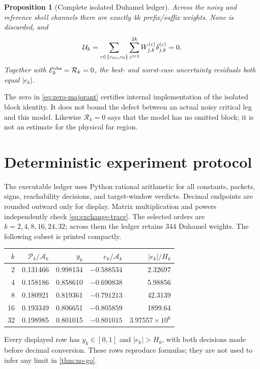 \documentclass[11pt]{article}
\newtheorem{proposition}[theorem]{Proposition}
\theoremstyle{remark}
\newcommand{\cA}{\mathcal A}
\newcommand{\cE}{\mathcal E}
\newcommand{\cP}{\mathcal P}
\newcommand{\cR}{\mathcal R}
\newcommand{\cU}{\mathcal U}
\begin{document}
\begin{proposition}[Complete isolated Duhamel ledger]
Across the noisy and reference shell channels there are exactly $4k$
prefix/suffix weights.  None is discarded, and
\begin{equation}
 \cU_k
 =\sum_{c\in\{c_{\rm iso},c_0\}}
   \sum_{j=1}^{2k}W_{j,k}^{(c)}\delta_{j,k}^{(c)}=0.
 \label{eq:zero-majorant}
\end{equation}
Together with $\cE_k^{\rm obs}=\cR_k=0$, the best- and worst-case
uncertainty residuals both equal $|e_k|$.
\end{proposition}

The zero in \eqref{eq:zero-majorant} certifies internal implementation of the
isolated block identity.  It does not bound the defect between an actual
noisy critical leg and this model.  Likewise $\cR_k=0$ says that the model
has no omitted block; it is not an estimate for the physical far region.

\section{Deterministic experiment protocol}

The executable ledger uses Python rational arithmetic for all constants,
packets, signs, reachability decisions, and target-window verdicts.  Decimal
endpoints are rounded outward only for display.  Matrix multiplication and
powers independently check \eqref{eq:exchange-trace}.  The selected orders
are $k=2,4,8,16,24,32$; across them the ledger retains 344 Duhamel weights.
The following subset is printed compactly.

\begin{center}
\begin{tabular}{@{}rrrrr@{}}
\toprule
$k$ & $\cP_k/\cA_k$ & $y_k$ & $e_k/\cA_k$ & $|e_k|/H_k$\\
\midrule
2  & 0.131466 & 0.998134 & $-0.588534$ & 2.32697\\
4  & 0.158186 & 0.858610 & $-0.690838$ & 5.98856\\
8  & 0.180921 & 0.819361 & $-0.791213$ & 42.3139\\
16 & 0.193349 & 0.806651 & $-0.805859$ & 1899.64\\
32 & 0.198985 & 0.801015 & $-0.801015$ & $3.97557\times10^6$\\
\bottomrule
\end{tabular}
\end{center}

Every displayed row has $y_k\in[0,1]$ and $|e_k|>H_k$, with both decisions
made before decimal conversion.  These rows reproduce formulas; they are not
used to infer any limit in \cref{thm:no-go}.
\end{document}
